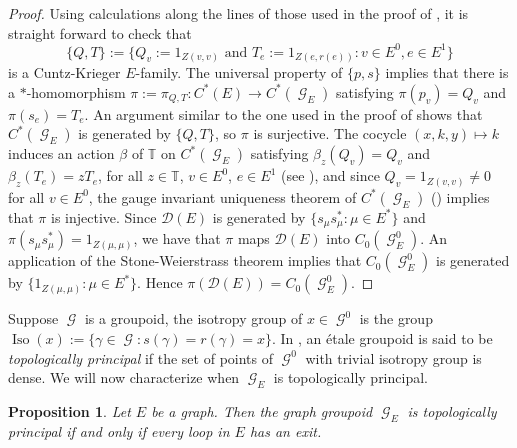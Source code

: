 \documentclass[12pt, a4paper]{amsart}
\numberwithin{equation}{section}
\newtheorem{prop}[thm]{Proposition}
\theoremstyle{definition}
\theoremstyle{remark}
\begin{document}
\begin{proof}
Using calculations along the lines of those used in the proof of \cite[Proposition 4.1]{KPRR}, it is straight forward to check that \[
\{Q,T\}:=\{Q_v:=1_{Z(v,v)} \text{ and } T_e:=1_{Z(e,r(e))} : v \in E^0, e \in E^1\}
\]
is a Cuntz-Krieger $E$-family. The universal property of $\{p,s\}$ implies 
that there is a $*$-homomorphism $\pi:=\pi_{Q,T}:C^*(E)\to C^* ({\operatorname{\mathcal{G}}}_E)$ 
satisfying $\pi(p_v)=Q_v$ and $\pi(s_e)=T_e$. An argument similar to the one 
used in the proof of \cite[Proposition 4.1]{KPRR} shows that $C^* ({\operatorname{\mathcal{G}}}_E)$ is 
generated by $\{Q,T\}$, so $\pi$ is surjective. The cocycle $(x,k,y)\mapsto k$ 
induces an action $\beta$ of ${\mathbb{T}}$ on $C^* ({\operatorname{\mathcal{G}}}_E)$ satisfying 
$\beta_z(Q_v)=Q_v$ and $\beta_z(T_e)=zT_e$, for all $z\in {\mathbb{T}}$, $v\in E^0$, 
$e\in E^1$ (see \cite[Proposition II.5.1]{Ren}), and since $Q_v=1_{Z(v,v)}\ne 
0$ for all $v\in E^0$, the gauge invariant uniqueness theorem of $C^*({\operatorname{\mathcal{G}}}_E)$ 
(\cite[Theorem 2.1]{BHRS}) implies that $\pi$ is injective. Since 
$\mathcal{D}(E)$ is generated by $\{s_\mu s_\mu^*:\mu\in E^*\}$ and $\pi(s_\mu 
s_\mu^*)=1_{Z(\mu,\mu)}$, we have that $\pi$ maps $\mathcal{D}(E)$ into 
$C_0({\operatorname{\mathcal{G}}}_E^0)$. An application of the Stone-Weierstrass theorem implies that 
$C_0({\operatorname{\mathcal{G}}}_E^0)$ is generated by $\{1_{Z(\mu,\mu)}:\mu\in E^*\}$. Hence 
$\pi(\mathcal{D}(E))=C_0({\operatorname{\mathcal{G}}}_E^0)$.
\end{proof}

Suppose ${\operatorname{\mathcal{G}}}$ is a groupoid, the isotropy group of $x\in {\operatorname{\mathcal{G}}}^0$ is the group ${\operatorname{Iso}}(x):=\{\gamma\in{\operatorname{\mathcal{G}}}:s(\gamma)=r(\gamma)=x\}$. In \cite{Ren2}, an \'{e}tale groupoid is said to be \emph{topologically principal} if the set of points of ${\operatorname{\mathcal{G}}}^0$ with trivial isotropy group is dense. We will now characterize when ${\operatorname{\mathcal{G}}}_E$ is topologically principal.

\begin{prop} \label{prop:topological principal}
	Let $E$ be a graph. Then the graph groupoid ${\operatorname{\mathcal{G}}}_E$ is topologically principal if and only if every loop in $E$ has an exit.
\end{prop}
\end{document}
